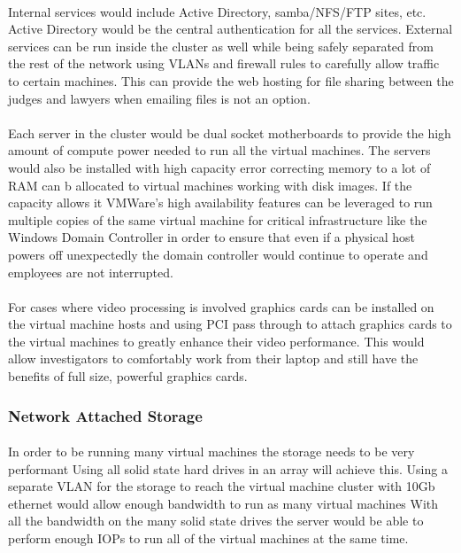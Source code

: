 \documentclass[12pt]{article}
\begin{document}
\paragraph{}
Internal services would include Active Directory, samba/NFS/FTP sites, etc.
Active Directory would be the central authentication for all the services.
External services can be run inside the cluster as well while being safely separated from the rest of the network using VLANs and firewall rules to carefully allow traffic to certain machines.
This can provide the web hosting for file sharing between the judges and lawyers when emailing files is not an option.
\paragraph{}
Each server in the cluster would be dual socket motherboards to provide the high amount of compute power needed to run all the virtual machines.
The servers would also be installed with high capacity error correcting memory to a lot of RAM can b allocated to virtual machines working with disk images.
If the capacity allows it VMWare's high availability features can be leveraged to run multiple copies of the same virtual machine for critical infrastructure like the Windows Domain Controller in order to ensure that even if a physical host powers off unexpectedly the domain controller would continue to operate and employees are not interrupted.
\paragraph{}
For cases where video processing is involved graphics cards can be installed on the virtual machine hosts and using PCI pass through to attach graphics cards to the virtual machines to greatly enhance their video performance.
This would allow investigators to comfortably work from their laptop and still have the benefits of full size, powerful graphics cards.

\subsubsection{Network Attached Storage}
\paragraph{} 
In order to be running many virtual machines the storage needs to be very performant Using all solid state hard drives in an array will achieve this.
Using a separate VLAN for the storage to reach the virtual machine cluster with 10Gb ethernet would allow enough bandwidth to run as many virtual machines 
With all the bandwidth on the many solid state drives the server would be able to perform enough IOPs to run all of the virtual machines at the same time.
\end{document}
